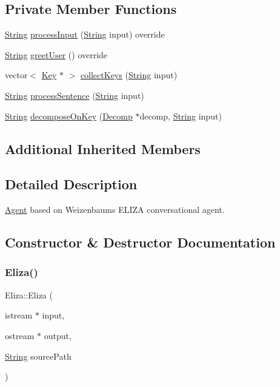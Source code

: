 \subsection*{Private Member Functions}
\begin{DoxyCompactItemize}
\item 
\mbox{\hyperlink{classString}{String}} \mbox{\hyperlink{classEliza_a9700906fb44016db11cd1183d5a1f1f3}{process\+Input}} (\mbox{\hyperlink{classString}{String}} input) override
\item 
\mbox{\hyperlink{classString}{String}} \mbox{\hyperlink{classEliza_a87224cd89d0e0dafbc2e8883d1a83f14}{greet\+User}} () override
\item 
vector$<$ \mbox{\hyperlink{classKey}{Key}} $\ast$ $>$ \mbox{\hyperlink{classEliza_adb573920365f86efd4974fa1af6e4f47}{collect\+Keys}} (\mbox{\hyperlink{classString}{String}} input)
\item 
\mbox{\hyperlink{classString}{String}} \mbox{\hyperlink{classEliza_a388dad084acdf7310dc1028bdee044f2}{process\+Sentence}} (\mbox{\hyperlink{classString}{String}} input)
\item 
\mbox{\hyperlink{classString}{String}} \mbox{\hyperlink{classEliza_a74fbfaf3553aa9224ba10ef0881d6f14}{decompose\+On\+Key}} (\mbox{\hyperlink{classDecomp}{Decomp}} $\ast$decomp, \mbox{\hyperlink{classString}{String}} input)
\end{DoxyCompactItemize}
\subsection*{Additional Inherited Members}


\subsection{Detailed Description}
\mbox{\hyperlink{classAgent}{Agent}} based on Weizenbaum\textquotesingle{}s E\+L\+I\+ZA conversational agent. 

\subsection{Constructor \& Destructor Documentation}
\mbox{\label{classEliza_a6246b8f323f27e7b5762560ad4ad7c11}} 
\subsubsection{\texorpdfstring{Eliza()}{Eliza()}}
{\footnotesize\ttfamily Eliza\+::\+Eliza (\begin{DoxyParamCaption}\item[{istream $\ast$}]{input,  }\item[{ostream $\ast$}]{output,  }\item[{\mbox{\hyperlink{classString}{String}}}]{source\+Path }\end{DoxyParamCaption})}

